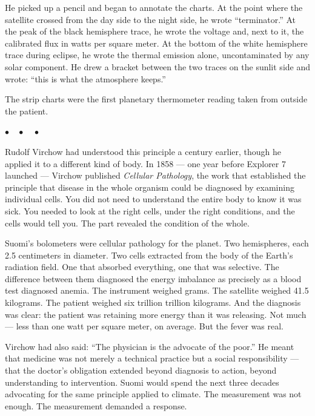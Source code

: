 \documentclass[12pt, letterpaper]{article}
\begin{document}
He picked up a pencil and began to annotate the charts. At the point where the satellite crossed from the day side to the night side, he wrote ``terminator.'' At the peak of the black hemisphere trace, he wrote the voltage and, next to it, the calibrated flux in watts per square meter. At the bottom of the white hemisphere trace during eclipse, he wrote the thermal emission alone, uncontaminated by any solar component. He drew a bracket between the two traces on the sunlit side and wrote: ``this is what the atmosphere keeps.''

The strip charts were the first planetary thermometer reading taken from outside the patient.

\begin{center}
$\bullet\quad\bullet\quad\bullet$
\end{center}

Rudolf Virchow had understood this principle a century earlier, though he applied it to a different kind of body. In 1858 --- one year before Explorer 7 launched --- Virchow published \textit{Cellular Pathology}, the work that established the principle that disease in the whole organism could be diagnosed by examining individual cells. You did not need to understand the entire body to know it was sick. You needed to look at the right cells, under the right conditions, and the cells would tell you. The part revealed the condition of the whole.

Suomi's bolometers were cellular pathology for the planet. Two hemispheres, each 2.5 centimeters in diameter. Two cells extracted from the body of the Earth's radiation field. One that absorbed everything, one that was selective. The difference between them diagnosed the energy imbalance as precisely as a blood test diagnosed anemia. The instrument weighed grams. The satellite weighed 41.5 kilograms. The patient weighed six trillion trillion kilograms. And the diagnosis was clear: the patient was retaining more energy than it was releasing. Not much --- less than one watt per square meter, on average. But the fever was real.

Virchow had also said: ``The physician is the advocate of the poor.'' He meant that medicine was not merely a technical practice but a social responsibility --- that the doctor's obligation extended beyond diagnosis to action, beyond understanding to intervention. Suomi would spend the next three decades advocating for the same principle applied to climate. The measurement was not enough. The measurement demanded a response.
\end{document}
